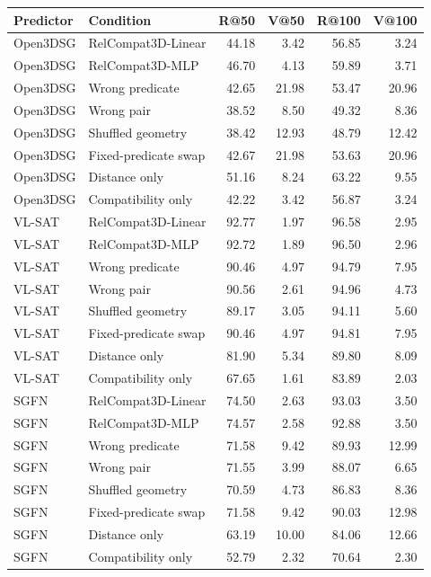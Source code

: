 \begin{tabular}{llrrrr}
\toprule
Predictor & Condition & R@50 & V@50 & R@100 & V@100 \\
\midrule
Open3DSG & RelCompat3D-Linear & 44.18 & 3.42 & 56.85 & 3.24 \\
Open3DSG & RelCompat3D-MLP & 46.70 & 4.13 & 59.89 & 3.71 \\
Open3DSG & Wrong predicate & 42.65 & 21.98 & 53.47 & 20.96 \\
Open3DSG & Wrong pair & 38.52 & 8.50 & 49.32 & 8.36 \\
Open3DSG & Shuffled geometry & 38.42 & 12.93 & 48.79 & 12.42 \\
Open3DSG & Fixed-predicate swap & 42.67 & 21.98 & 53.63 & 20.96 \\
Open3DSG & Distance only & 51.16 & 8.24 & 63.22 & 9.55 \\
Open3DSG & Compatibility only & 42.22 & 3.42 & 56.87 & 3.24 \\
VL-SAT & RelCompat3D-Linear & 92.77 & 1.97 & 96.58 & 2.95 \\
VL-SAT & RelCompat3D-MLP & 92.72 & 1.89 & 96.50 & 2.96 \\
VL-SAT & Wrong predicate & 90.46 & 4.97 & 94.79 & 7.95 \\
VL-SAT & Wrong pair & 90.56 & 2.61 & 94.96 & 4.73 \\
VL-SAT & Shuffled geometry & 89.17 & 3.05 & 94.11 & 5.60 \\
VL-SAT & Fixed-predicate swap & 90.46 & 4.97 & 94.81 & 7.95 \\
VL-SAT & Distance only & 81.90 & 5.34 & 89.80 & 8.09 \\
VL-SAT & Compatibility only & 67.65 & 1.61 & 83.89 & 2.03 \\
SGFN & RelCompat3D-Linear & 74.50 & 2.63 & 93.03 & 3.50 \\
SGFN & RelCompat3D-MLP & 74.57 & 2.58 & 92.88 & 3.50 \\
SGFN & Wrong predicate & 71.58 & 9.42 & 89.93 & 12.99 \\
SGFN & Wrong pair & 71.55 & 3.99 & 88.07 & 6.65 \\
SGFN & Shuffled geometry & 70.59 & 4.73 & 86.83 & 8.36 \\
SGFN & Fixed-predicate swap & 71.58 & 9.42 & 90.03 & 12.98 \\
SGFN & Distance only & 63.19 & 10.00 & 84.06 & 12.66 \\
SGFN & Compatibility only & 52.79 & 2.32 & 70.64 & 2.30 \\
\bottomrule
\end{tabular}
